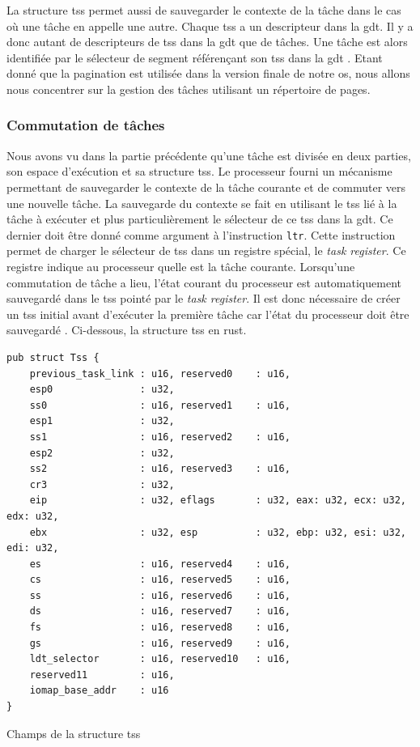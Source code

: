 La structure \acrshort{tss} permet aussi de sauvegarder le contexte de la tâche
dans le cas où une tâche en appelle une autre. Chaque \acrshort{tss} a un descripteur
dans la \acrshort{gdt}. Il y a donc autant de descripteurs de \acrshort{tss} dans
la \acrshort{gdt} que de tâches. Une tâche est alors identifiée par le sélecteur
de segment référençant son \acrshort{tss} dans la \acrshort{gdt} \cite{ref42}. Etant
donné que la pagination est utilisée dans la version finale de notre \acrshort{os},
nous allons nous concentrer sur la gestion des tâches utilisant un répertoire de
pages.


\subsubsection{Commutation de tâches}
Nous avons vu dans la partie précédente qu'une tâche est divisée en deux parties,
son espace d'exécution et sa structure \acrshort{tss}. Le processeur fourni un
mécanisme permettant de sauvegarder le contexte de la tâche courante et de commuter
vers une nouvelle tâche. La sauvegarde du contexte se fait en utilisant le \acrshort{tss}
lié à la tâche à exécuter et plus particulièrement le sélecteur de ce \acrshort{tss}
dans la \acrshort{gdt}. Ce dernier doit être donné comme argument à l'instruction
\texttt{ltr}. Cette instruction permet de charger le sélecteur de \acrshort{tss}
dans un registre spécial, le \textit{task register}. Ce registre indique au processeur
quelle est la tâche courante. Lorsqu'une commutation de tâche a lieu, l'état
courant du processeur est automatiquement sauvegardé dans le \acrshort{tss} pointé
par le \textit{task register}. Il est donc nécessaire de créer un \acrshort{tss}
initial avant d'exécuter la première tâche car l'état du processeur doit être
sauvegardé \cite{ref42}. Ci-dessous, la structure \acrshort{tss} en rust.

\begin{code}
\begin{verbatim}
pub struct Tss {
    previous_task_link : u16, reserved0    : u16,
    esp0               : u32,
    ss0                : u16, reserved1    : u16,
    esp1               : u32,
    ss1                : u16, reserved2    : u16,
    esp2               : u32,
    ss2                : u16, reserved3    : u16,
    cr3                : u32,
    eip                : u32, eflags       : u32, eax: u32, ecx: u32, edx: u32,
    ebx                : u32, esp          : u32, ebp: u32, esi: u32, edi: u32,
    es                 : u16, reserved4    : u16,
    cs                 : u16, reserved5    : u16,
    ss                 : u16, reserved6    : u16,
    ds                 : u16, reserved7    : u16,
    fs                 : u16, reserved8    : u16,
    gs                 : u16, reserved9    : u16,
    ldt_selector       : u16, reserved10   : u16,
    reserved11         : u16,
    iomap_base_addr    : u16
}
\end{verbatim}
\caption{Champs de la structure \acrshort{tss}}
\label{lst:tasks:tss}
\end{code} \bigbreak

